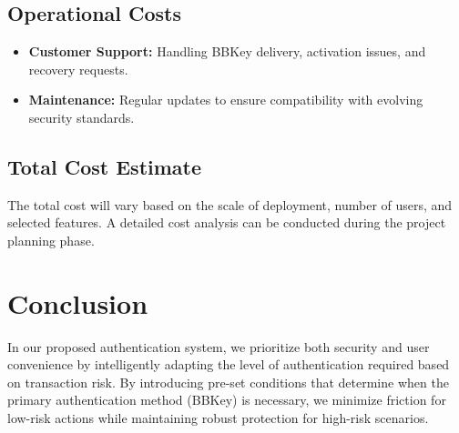 \documentclass{article}[12pt]
\begin{document}
\subsection*{Operational Costs}
\begin{itemize}
    \item \textbf{Customer Support:} Handling BBKey delivery, activation issues, and recovery requests.
    \item \textbf{Maintenance:} Regular updates to ensure compatibility with evolving security standards.
\end{itemize}

\subsection*{Total Cost Estimate}
The total cost will vary based on the scale of deployment, number of users, and selected features. A detailed cost analysis can be conducted during the project planning phase.

\section*{Conclusion}
In our proposed authentication system, we prioritize both security and user convenience by intelligently adapting the level of authentication required based on transaction risk. By introducing pre-set conditions that determine when the primary authentication method (BBKey) is necessary, we minimize friction for low-risk actions while maintaining robust protection for high-risk scenarios.
\end{document}
